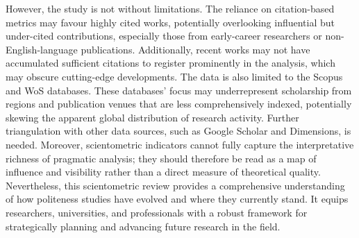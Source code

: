 \documentclass[english]{textolivre}
\begin{document}
However, the study is not without limitations. The reliance on citation-based metrics may favour highly cited works, potentially overlooking influential but under-cited contributions, especially those from early-career researchers or non-English-language publications. Additionally, recent works may not have accumulated sufficient citations to register prominently in the analysis, which may obscure cutting-edge developments. The data is also limited to the Scopus and WoS databases. These databases’ focus may underrepresent scholarship from regions and publication venues that are less comprehensively indexed, potentially skewing the apparent global distribution of research activity. Further triangulation with other data sources, such as Google Scholar and Dimensions, is needed. Moreover, scientometric indicators cannot fully capture the interpretative richness of pragmatic analysis; they should therefore be read as a map of influence and visibility rather than a direct measure of theoretical quality. Nevertheless, this scientometric review provides a comprehensive understanding of how politeness studies have evolved and where they currently stand. It equips researchers, universities, and professionals with a robust framework for strategically planning and advancing future research in the field.
\end{document}
